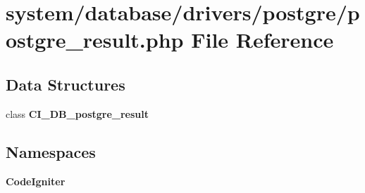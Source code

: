 \section{system/database/drivers/postgre/postgre\-\_\-result.php File Reference}
\label{postgre__result_8php}
\subsection*{Data Structures}
\begin{DoxyCompactItemize}
\item 
class {\bf C\-I\-\_\-\-D\-B\-\_\-postgre\-\_\-result}
\end{DoxyCompactItemize}
\subsection*{Namespaces}
\begin{DoxyCompactItemize}
\item 
{\bf Code\-Igniter}
\end{DoxyCompactItemize}
